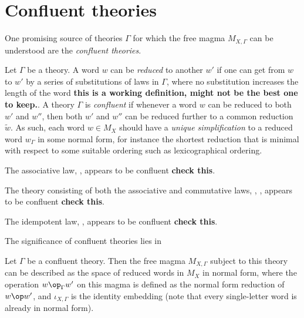 \section{Confluent theories}

One promising source of theories $\Gamma$ for which the free magma $M_{X,\Gamma}$ can be understood are the \emph{confluent theories}.

\begin{definition}\label{confluent-theory}
  Let $\Gamma$ be a theory.  A word $w$ can be \emph{reduced} to another $w'$ if one can get from $w$ to $w'$ by a series of substitutions of laws in $\Gamma$, where no substitution increases the length of the word {\bf this is a working definition, might not be the best one to keep.}.  A theory $\Gamma$ is \emph{confluent} if whenever a word $w$ can be reduced to both $w'$ and $w''$, then both $w'$ and $w''$ can be reduced further to a common reduction $\tilde w$.  As such, each word $w \in M_X$ should have a \emph{unique simplification} to a reduced word $w_\Gamma$ in some normal form, for instance the shortest reduction that is minimal with respect to some suitable ordering such as lexicographical ordering.
\end{definition}

\begin{example}
  The associative law, , appears to be confluent {\bf check this}.
\end{example}

\begin{example}
  The theory consisting of both the associative and commutative laws, , , appears to be confluent {\bf check this}.
\end{example}

\begin{example}
  The idempotent law, , appears to be confluent {\bf check this}.
\end{example}

The significance of confluent theories lies in

\begin{theorem}\label{free-confluent}
  Let $\Gamma$ be a confluent theory.  Then the free magma $M_{X,\Gamma}$ subject to this theory can be described as the space of reduced words in $M_X$ in normal form, where the operation $w \op_\Gamma w'$ on this magma is defined as the normal form reduction of $w \op w'$, and $\iota_{X,\Gamma}$ is the identity embedding (note that every single-letter word is already in normal form).
\end{theorem}


